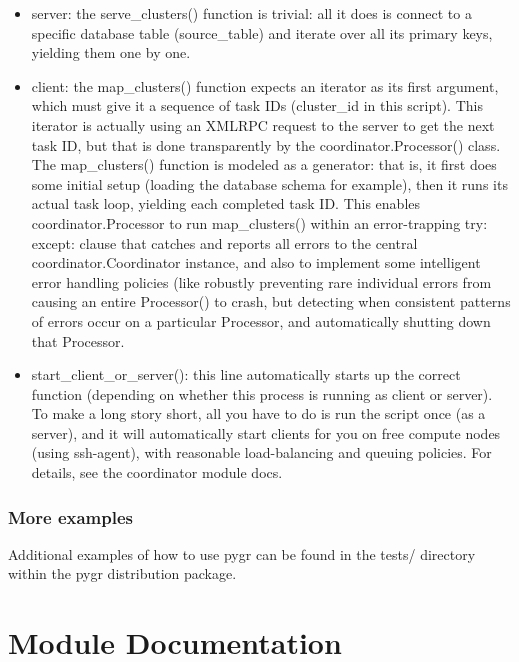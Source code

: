 \documentclass{howto}
\begin{document}
\begin{itemize}

\item
server: the serve_clusters() function is trivial: all it does is connect to a specific database table (source_table) and iterate over all its primary keys, yielding them one by one.

\item    
client: the map_clusters() function expects an iterator as its first argument, which must give it a sequence of task IDs (cluster_id in this script).  This iterator is actually using an XMLRPC request to the server to get the next task ID, but that is done transparently by the coordinator.Processor() class.  The map_clusters() function is modeled as a generator: that is, it first does some initial setup (loading the database schema for example), then it runs its actual task loop, yielding each completed task ID. This enables coordinator.Processor to run map_clusters() within an error-trapping try: except: clause that catches and reports all errors to the central coordinator.Coordinator instance, and also to implement some intelligent error handling policies (like robustly preventing rare individual errors from causing an entire Processor() to crash, but detecting when consistent patterns of errors occur on a particular Processor, and automatically shutting down that Processor.

\item 
start_client_or_server(): this line automatically starts up the correct function (depending on whether this process is running as client or server).  To make a long story short, all you have to do is run the script once (as a server), and it will automatically start clients for you on free compute nodes (using ssh-agent), with reasonable load-balancing and queuing policies.  For details, see the coordinator module docs.
\end{itemize}


\subsubsection{More examples}
\label{more-exam}

Additional examples of how to use pygr can be found in the tests/ directory within the pygr distribution package.


\section{Module Documentation}
\label{module-doc}
\end{document}
